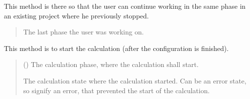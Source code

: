 \documentclass[letterpaper,10pt,english]{sphinxmanual}
\begin{document}
\begin{fulllineitems}
\begin{fulllineitems}
\label{\detokenize{apidoc/src.osm_configurator.model.project:src.osm_configurator.model.project.active_project.ActiveProject.get_last_step}}
\pysigstartsignatures
{}
\pysigstopsignatures
\sphinxAtStartPar
This method is there so that the user can continue working in the same phase in an existing project
where he previously stopped.
\begin{quote}\begin{description}
\sphinxAtStartPar
The last phase the user was working on.

\sphinxAtStartPar
{\hyperref[\detokenize{apidoc/src.osm_configurator.model.project:src.osm_configurator.model.project.config_phase_enum.ConfigPhase}]{}}

\end{description}\end{quote}

\end{fulllineitems}


\begin{fulllineitems}
\label{\detokenize{apidoc/src.osm_configurator.model.project:src.osm_configurator.model.project.active_project.ActiveProject.start_calculation}}
\pysigstartsignatures
{}
\pysigstopsignatures
\sphinxAtStartPar
This method is to start the calculation (after the configuration is finished).
\begin{quote}\begin{description}
\sphinxAtStartPar
{} ({\hyperref[\detokenize{apidoc/src.osm_configurator.model.project.calculation:src.osm_configurator.model.project.calculation.calculation_phase_enum.CalculationPhase}]{}}) \textendash{} The calculation phase, where the calculation shall start.

\sphinxAtStartPar
The calculation state where the calculation started. Can be an error state, so signify an error, that prevented the start of the calculation.


\end{description}
\end{quote}
\end{fulllineitems}
\end{fulllineitems}
\end{document}
